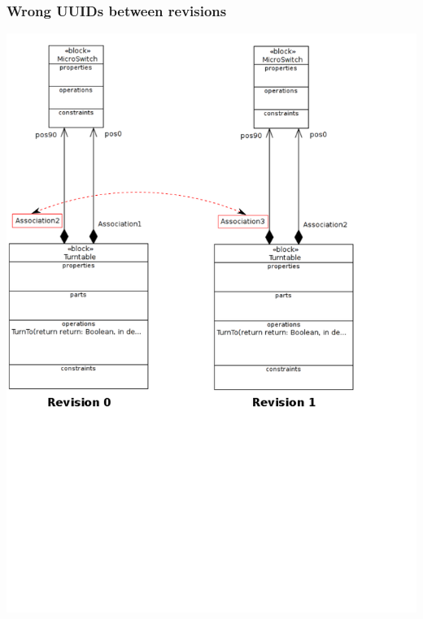 \documentclass[10pt]{beamer}
\begin{document}
\begin{frame}
\frametitle{Wrong UUIDs between revisions}
\begin{center}
\includegraphics[scale=0.33]{wrongUUIDs_examples_p2}\\
\end{center}
\end{frame}
\end{document}
